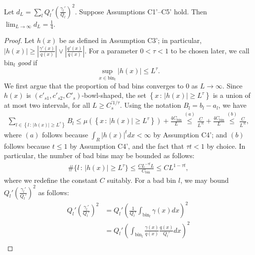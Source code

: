 \documentclass{article}
\newcommand{\bin}{\text{bin}}
\begin{document}

\begin{lemma}
\label{prop:d_dL_convergence}
Let $d_L = \sum_l Q_l' \left( \frac{\gamma_l'}{Q_l} \right)^2$. Suppose Assumptions C1'--C5' hold. Then $\lim_{L \to \infty} d_L = \frac{1}{4}$.
\end{lemma}

\begin{proof}
Let $h(x)$ be as defined in Assumption C3'; in particular, $|h(x)| \geq 
\left| \frac{\gamma'(x)}{q(x)} \right| \vee \left| \frac{q'(x)}{q(x)} \right|$.  For a parameter $0 < \tau < 1$ to be chosen later, we call $\bin_l$ \emph{good} if
$$
\sup_{x \in \bin_l} |h(x)| \leq L^\tau.
$$
We first argue that the proportion of bad bins converges to 0 as $L \rightarrow \infty$. Since $h(x)$ is $(c'_{s1}, c'_{s2}, C'_s)$-bowl-shaped, the set $\left \{x \,:\, |h(x)|  \geq L^\tau \right \}$ is a union of at most two intervals, for all $L \geq C_s^{\prime 1/\tau}$. Using the notation $B_l = b_l - a_l$, we have
\begin{align*}
\sum_{l \in \left \{ l \,:\, |h(x)| 
           \geq L^\tau \right \}}  B_l \leq 
   \mu \left( \left\{x \,:\, |h(x)|
         \geq L^\tau \right\} \right) + \frac{4 C_\bin}{L} \stackrel{(a)}\leq \frac{C}{L^{\tau t}}  + \frac{4 C_\bin}{L} \stackrel{(b)}\leq \frac{C}{L^{\tau t}},
\end{align*}
where $(a)$ follows because $\int_R |h(x)|^t dx < \infty$ by Assumption C4'; and $(b)$ follows because $t \leq 1$ by Assumption C4', and the fact that $\tau t < 1$ by choice. In particular, the number of bad bins may be bounded as follows:
\begin{align*}
\# \{ l \,:\, |h(x)| \geq L^\tau \} \leq \frac{C L^{- \tau t} L}{C_\bin}  \leq C L^{1 - \tau t},
\end{align*}
where we redefine the constant $C$ suitably. For a bad bin $l$, we may bound $Q_l' \left( \frac{\gamma_l'}{Q_l'} \right)^2$ as follows:
\begin{align*}
Q_l' \left( \frac{\gamma_l'}{Q_l'} \right)^2 &= Q_l' \left( \frac{1}{Q_l'} \int_{\bin_l} \gamma(x) dx \right)^2 \\
   &= Q_l' \left(  \int_{\bin_l} \frac{\gamma(x)}{q(x)} \frac{q(x)}{Q_l'} dx \right)^2 \\

\end{align*}
\end{proof}
\end{document}
